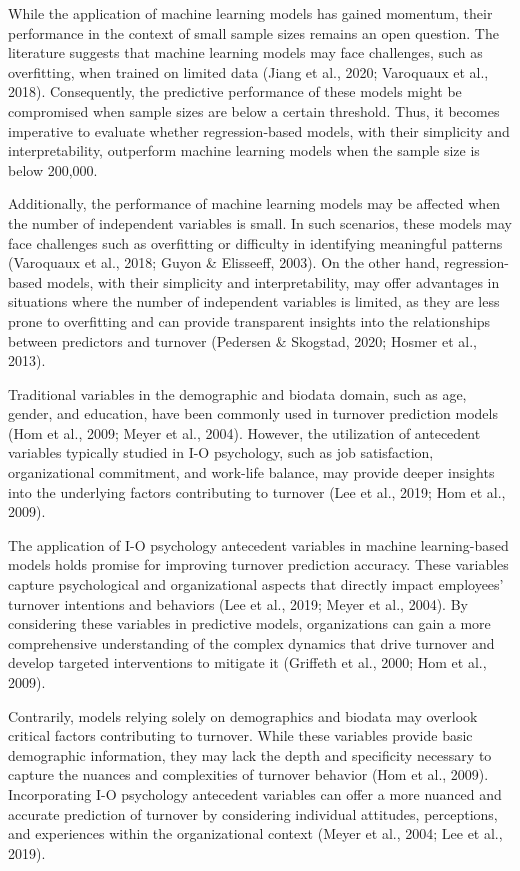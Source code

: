 \documentclass[
  man]{apa6}
\begin{document}
While the application of machine learning models has gained momentum, their performance in the context of small sample sizes remains an open question. The literature suggests that machine learning models may face challenges, such as overfitting, when trained on limited data (Jiang et al., 2020; Varoquaux et al., 2018). Consequently, the predictive performance of these models might be compromised when sample sizes are below a certain threshold. Thus, it becomes imperative to evaluate whether regression-based models, with their simplicity and interpretability, outperform machine learning models when the sample size is below 200,000.

Additionally, the performance of machine learning models may be affected when the number of independent variables is small. In such scenarios, these models may face challenges such as overfitting or difficulty in identifying meaningful patterns (Varoquaux et al., 2018; Guyon \& Elisseeff, 2003). On the other hand, regression-based models, with their simplicity and interpretability, may offer advantages in situations where the number of independent variables is limited, as they are less prone to overfitting and can provide transparent insights into the relationships between predictors and turnover (Pedersen \& Skogstad, 2020; Hosmer et al., 2013).

Traditional variables in the demographic and biodata domain, such as age, gender, and education, have been commonly used in turnover prediction models (Hom et al., 2009; Meyer et al., 2004). However, the utilization of antecedent variables typically studied in I-O psychology, such as job satisfaction, organizational commitment, and work-life balance, may provide deeper insights into the underlying factors contributing to turnover (Lee et al., 2019; Hom et al., 2009).

The application of I-O psychology antecedent variables in machine learning-based models holds promise for improving turnover prediction accuracy. These variables capture psychological and organizational aspects that directly impact employees' turnover intentions and behaviors (Lee et al., 2019; Meyer et al., 2004). By considering these variables in predictive models, organizations can gain a more comprehensive understanding of the complex dynamics that drive turnover and develop targeted interventions to mitigate it (Griffeth et al., 2000; Hom et al., 2009).

Contrarily, models relying solely on demographics and biodata may overlook critical factors contributing to turnover. While these variables provide basic demographic information, they may lack the depth and specificity necessary to capture the nuances and complexities of turnover behavior (Hom et al., 2009). Incorporating I-O psychology antecedent variables can offer a more nuanced and accurate prediction of turnover by considering individual attitudes, perceptions, and experiences within the organizational context (Meyer et al., 2004; Lee et al., 2019).
\end{document}
